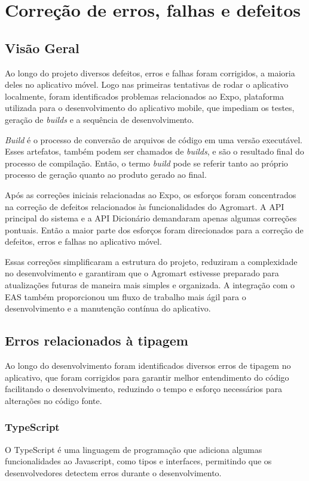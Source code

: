 \chapter[Correção de erros, falhas e defeitos]{Correção de erros, falhas e defeitos}

\section{Visão Geral}
Ao longo do projeto diversos defeitos, erros e falhas foram corrigidos, a maioria deles no aplicativo móvel. Logo nas primeiras tentativas de rodar o aplicativo localmente, foram identificados problemas relacionados ao Expo, plataforma utilizada para o desenvolvimento do aplicativo mobile, que impediam os testes, geração de \textit{builds} e a sequência de desenvolvimento.

\textit{Build} é o processo de conversão de arquivos de código em uma versão executável. Esses artefatos, também podem ser chamados de \textit{builds}, e são o resultado final do processo de compilação. Então, o termo \textit{build} pode se referir tanto ao próprio processo de geração quanto ao produto gerado ao final.

Após as correções iniciais relacionadas ao Expo, os esforços foram concentrados na correção de defeitos relacionados às funcionalidades do Agromart. A API principal do sistema e a API Dicionário demandaram apenas algumas correções pontuais. Então a maior parte dos esforços foram direcionados para a correção de defeitos, erros e falhas no aplicativo móvel.

Essas correções simplificaram a estrutura do projeto, reduziram a complexidade no desenvolvimento e garantiram que o Agromart estivesse preparado para atualizações futuras de maneira mais simples e organizada. A integração com o EAS também proporcionou um fluxo de trabalho mais ágil para o desenvolvimento e a manutenção contínua do aplicativo.

\section{Erros relacionados à tipagem}
Ao longo do desenvolvimento foram identificados diversos erros de tipagem no aplicativo, que foram corrigidos para garantir melhor entendimento do código facilitando o desenvolvimento, reduzindo o tempo e esforço necessários para alterações no código fonte.

\subsection{TypeScript}
O TypeScript é uma linguagem de programação que adiciona algumas funcionalidades ao Javascript, como tipos e interfaces, permitindo que os desenvolvedores detectem erros durante o desenvolvimento. 

